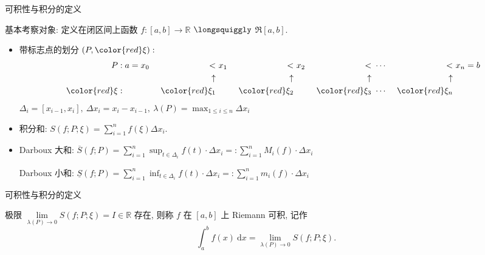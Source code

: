 
\begin{frame}{可积性与积分的定义}

基本考察对象: 定义在闭区间上函数 $f: [a, b] \longrightarrow \mathbb{R}$
\pause
$\longsquiggly$ $\mathfrak{R}[a,b].$

\pause

\begin{itemize}[<+->]
\item {\color{red}带标志点的}划分 $(P, {\color{red}\xi}):$
\begin{alignat*}{8}
P & : a = x_0 & < & ~ x_1 & < & ~ x_2 & ~ < & ~ \cdots & ~ < & ~ x_n = b \\
& & \uparrow & & \uparrow & & \uparrow & & \uparrow & \\
{\color{red}\xi} & : & ~ {\color{red}\xi_1} & & ~ {\color{red}\xi_2} & & ~ {\color{red}\xi_3} & ~ \cdots & ~ {\color{red}\xi_n} &
\end{alignat*}
$\Delta_i = [x_{i-1}, x_i], ~ \Delta x_i = x_i - x_{i-1}, ~ \lambda(P) = \max_{1 \leqslant i \leqslant n} \Delta x_i$
\item 积分和: $S(f; P; \xi) = \sum\limits_{i=1}^n f(\xi) \Delta x_i.$
\item Darboux 大和: $\overline{S}(f; P) = \sum\limits_{i=1}^n \sup_{t\in\Delta_i} f(t) \cdot \Delta x_i =: \sum\limits_{i=1}^n M_i(f) \cdot \Delta x_i$ \par
Darboux 小和: $\underline{S}(f; P) = \sum\limits_{i=1}^n \inf_{t\in\Delta_i} f(t) \cdot \Delta x_i =: \sum\limits_{i=1}^n m_i(f) \cdot \Delta x_i$
\end{itemize}

\end{frame}


\begin{frame}{可积性与积分的定义}

\begin{Def}[函数 Riemann 可积]
极限 $\lim\limits_{\lambda(P) \to 0} S(f; P; \xi) = I \in \mathbb{R}$ 存在, 则称 $f$ 在 $[a, b]$ 上 Riemann 可积, 记作
\[\int_a^b f(x) ~ \mathrm{d} x = \lim\limits_{\lambda(P) \to 0} S(f; P; \xi).\]
\end{Def}

\end{frame}


